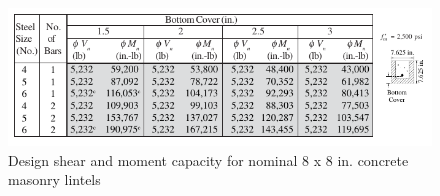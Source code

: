 \begin{figure}
  \begin{center}
  \includegraphics[width=120mm]{results_lintels/lintels_figures/blocks_8_8}
  \end{center}
  \caption{Design shear and moment capacity for nominal 8 x 8 in. concrete masonry lintels}\label{8x8}
\end{figure}


